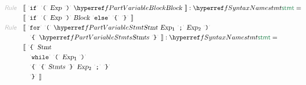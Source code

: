 \begin{align*}
  \KEY{Rule} \quad
    & \LEFTPHRASE \
        \LEX{if} \ \LEX{{(}} \ \VARHYPER{../.}{SIMPLE-2-Expressions}{Exp} \ \LEX{{)}} \ \VARREF{Block} \
      \RIGHTPHRASE : \SYNREF{stmt} = \\&
      \LEFTPHRASE \
        \LEX{if} \ \LEX{{(}} \ \VAR{Exp} \ \LEX{{)}} \ \VAR{Block} \ \LEX{else} \ \LEX{{\LEFTBRACE}} \ \LEX{{\RIGHTBRACE}} \
      \RIGHTPHRASE
\\
  \KEY{Rule} \quad
    & \LEFTPHRASE \
        \LEX{for} \ \LEX{{(}} \ \VARREF{Stmt} \ \VARHYPER{../.}{SIMPLE-2-Expressions}{Exp}\SUB{1} \ \LEX{{;}} \ \VARHYPER{../.}{SIMPLE-2-Expressions}{Exp}\SUB{2} \ \LEX{{)}} \\&\quad
        \LEX{{\LEFTBRACE}} \ \VARREF{Stmts} \ \LEX{{\RIGHTBRACE}} \
      \RIGHTPHRASE : \SYNREF{stmt} = \\&
      \LEFTPHRASE \
        \LEX{{\LEFTBRACE}} \ \VAR{Stmt} \\&\quad
        \LEX{while} \ \LEX{{(}} \ \VAR{Exp}\SUB{1} \ \LEX{{)}} \\&\quad
        \LEX{{\LEFTBRACE}} \ \LEX{{\LEFTBRACE}} \ \VAR{Stmts} \ \LEX{{\RIGHTBRACE}} \ \VAR{Exp}\SUB{2} \ \LEX{{;}} \ \LEX{{\RIGHTBRACE}} \\&\quad
        \LEX{{\RIGHTBRACE}} \
      \RIGHTPHRASE
\end{align*}
